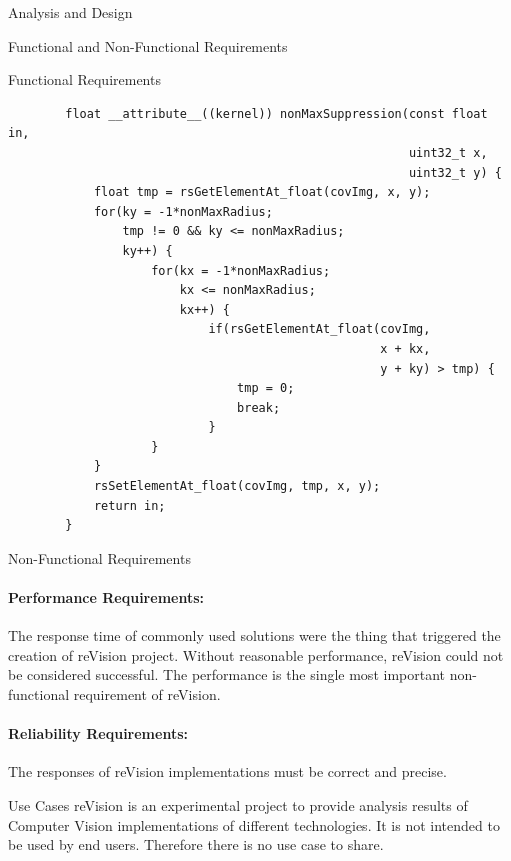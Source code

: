 \documentclass[12pt, a4paper]{article} \pagenumbering{gobble}
\begin{document}
\begin{section}{Analysis and Design}
\begin{subsection}{Functional and Non-Functional Requirements}
\begin{subsubsection}{Functional Requirements}
      {\ttfamily
      \begin{lstlisting}
        float __attribute__((kernel)) nonMaxSuppression(const float in,
                                                        uint32_t x,
                                                        uint32_t y) {
            float tmp = rsGetElementAt_float(covImg, x, y);
            for(ky = -1*nonMaxRadius;
                tmp != 0 && ky <= nonMaxRadius;
                ky++) {
                    for(kx = -1*nonMaxRadius;
                        kx <= nonMaxRadius;
                        kx++) {
                            if(rsGetElementAt_float(covImg,
                                                    x + kx,
                                                    y + ky) > tmp) {
                                tmp = 0;
                                break;
                            }
                    }
            }
            rsSetElementAt_float(covImg, tmp, x, y);
            return in;
        }
      \end{lstlisting}
      }
    \end{subsubsection}
    \newpage
    \begin{subsubsection}{Non-Functional Requirements}
      \paragraph{Performance Requirements:}{
        The response time of commonly used solutions were the thing that triggered the creation of reVision project.
        Without reasonable performance, reVision could not be considered successful.
        The performance is the single most important non-functional requirement of reVision.
      }
      ​
      \paragraph{Reliability Requirements:}{
        The responses of reVision implementations must be correct and precise.
      }
    \end{subsubsection}
  \end{subsection}

  \begin{subsection}{Use Cases}
    reVision is an experimental project to provide analysis results of Computer Vision implementations of different technologies.
    It is not intended to be used by end users. Therefore there is no use case to share.

  \end{subsection}
\end{section}
\end{document}
